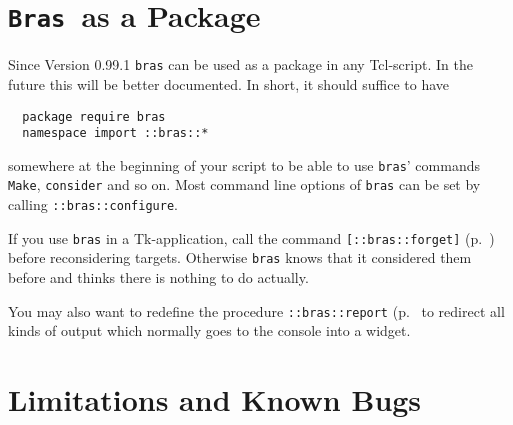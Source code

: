 \documentclass[11pt]{scrartcl}
\newcommand{\bras}{\texttt{bras}}
\newcommand{\Bras}{\texttt{Bras}}
\begin{document}
\section{\Bras\ as a Package}

Since Version 0.99.1 \bras{} can be used as a package in any
Tcl-script. In the future this will be better documented. In short,
it should suffice to have
\begin{verbatim}
  package require bras
  namespace import ::bras::*
\end{verbatim}
somewhere at the beginning of your script to be able to use \bras'
commands \texttt{Make}, \texttt{consider} and so on. Most command line 
options of \bras{} can be set by calling \texttt{::bras::configure}.

If you use \bras{} in a Tk-application, call the command
\texttt{[::bras::forget]} (p.~\pageref{proc:forget}) before
reconsidering targets. Otherwise \bras{} knows that it considered them
before and thinks there is nothing to do actually.

You may also want to redefine the procedure \texttt{::bras::report}
(p.~\pageref{proc:report} to redirect all kinds of output which
normally goes to the console into a widget.
\section{Limitations and Known Bugs}
\end{document}
